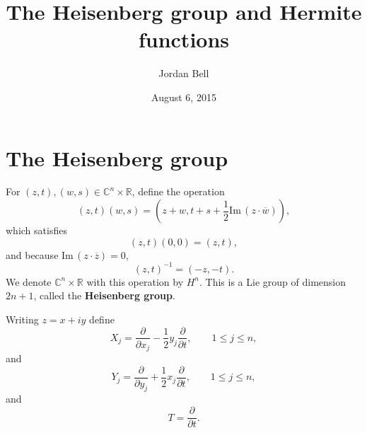 \documentclass{article}
\def\Im{\ensuremath{\mathrm{Im}}\,}
\theoremstyle{definition}
\theoremstyle{definition}
\begin{document}
\title{The Heisenberg group and Hermite functions}
\author{Jordan Bell}
\date{August 6, 2015}

\maketitle


\section{The Heisenberg group}
For $(z,t),(w,s) \in \mathbb{C}^n \times \mathbb{R}$, define the operation
\[
(z,t)(w,s) = \left(z+w,t+s+\frac{1}{2} \Im(z \cdot \overline{w})\right),
\]
which satisfies
\[
(z,t)(0,0) = (z,t),
\]
and because $\Im(z \cdot \overline{z})=0$,
\[
(z,t)^{-1}=(-z,-t).
\]
We denote $\mathbb{C}^n \times\mathbb{R}$ with this operation by $H^n$. This is a Lie group of dimension $2n+1$, 
called the \textbf{Heisenberg group}.

Writing $z=x+iy$ define
\[
X_j = \frac{\partial}{\partial x_j} - \frac{1}{2}y_j \frac{\partial}{\partial t},\qquad 1 \leq j \leq n,
\]
and
\[
Y_j = \frac{\partial}{\partial y_j} + \frac{1}{2}x_j \frac{\partial}{\partial t},\qquad 1 \leq j \leq n,
\]
and
\[
T = \frac{\partial}{\partial t}.
\]
\end{document}
